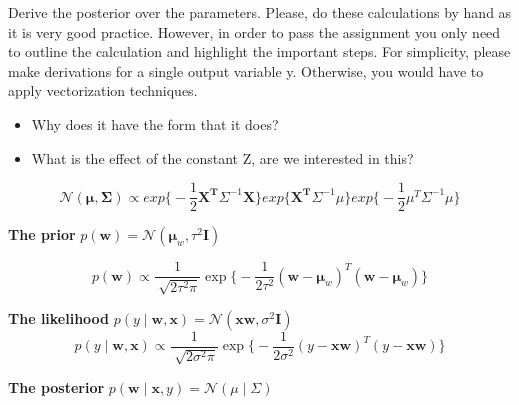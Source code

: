 \documentclass[12pt]{article}
\newenvironment{question}[2][Question]{\begin{trivlist}
\kern10pt
\item[\hskip \labelsep {\bfseries #1}\hskip \labelsep {\bfseries #2.}]}{\end{trivlist}}
\newcommand*{\answer}{%
  \par
  \kern1pt
  \begingroup
    \centering
    \raisebox{.2\baselineskip}{%
      \textcolor{gray}{
	    \rule{.6667\linewidth}{.1pt}%
      }
    }%
    \par
  \kern8pt
  \endgroup
}
\begin{document}
\begin{question}{6}
Derive the posterior over the parameters. Please, do these calculations by hand as it is very good practice. However, in order to pass the assignment you only need to outline the calculation and highlight the important steps. For simplicity, please make derivations for a single output variable y. Otherwise, you would have to apply vectorization techniques.

\begin{itemize}
\item Why does it have the form that it does?
\item What is the effect of the constant Z, are we interested in this?
\end{itemize}

\answer

$$\mathcal{N} (\boldsymbol{\mu, \Sigma}) \propto exp \Big\{ - \frac{1}{2}\boldsymbol{X^T}\Sigma^{-1}\boldsymbol{X}\Big\} exp \Big\{ \boldsymbol{X^T}\Sigma^{-1}\mu\Big\} exp \Big\{ - \frac{1}{2} \mu^T \Sigma^{-1} \mu \Big\}$$

\textbf{The prior} $p(\boldsymbol{w}) = \mathcal{N}(\boldsymbol{\mu}_w, \tau^2\boldsymbol{I})$

\begin{equation}
p(\boldsymbol{w}) \propto \frac{1}{\sqrt[]{2\tau^2\pi}}\exp\Big\{-\frac{1}{2\tau^2}(\boldsymbol{w}-\boldsymbol{\mu}_w)^T(\boldsymbol{w}-\boldsymbol{\mu}_w)\Big\}
\end{equation}

\textbf{The likelihood} $p(y \mid \boldsymbol{w}, \boldsymbol{x}) = \mathcal{N}(\boldsymbol{x}\boldsymbol{w}, \sigma^2\boldsymbol{I})$
\begin{equation}
p(y \mid \boldsymbol{w}, \boldsymbol{x}) \propto \frac{1}{\sqrt[]{2\sigma^2\pi}}\exp\Big\{-\frac{1}{2\sigma^2}(y-\boldsymbol{x}\boldsymbol{w})^T(y-\boldsymbol{x}\boldsymbol{w})\Big\}
\end{equation}

\textbf{The posterior} $p(\boldsymbol{w} \mid \boldsymbol{x}, y) = \mathcal{N}(\mu \mid \Sigma)$


\end{question}
\end{document}
